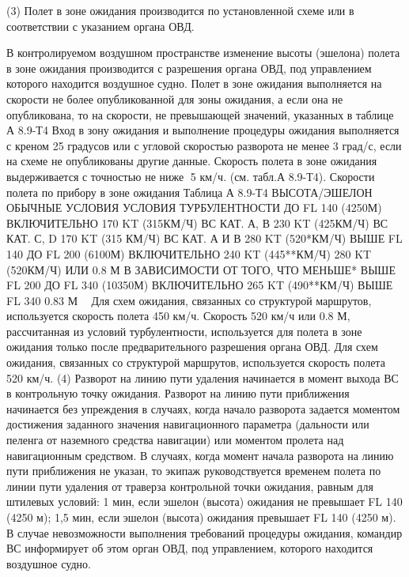        (3) Полет в зоне ожидания производится по установленной схеме или в соответствии с указанием органа ОВД.

 
В контролируемом воздушном пространстве изменение высоты (эшелона) полета в зоне ожидания производится с разрешения органа ОВД, под управлением которого находится воздушное судно. 
Полет в зоне ожидания выполняется на скорости не более опубликованной для зоны ожидания, а если она не опубликована, то на скорости, не превышающей значений, указанных в таблице А 8.9-Т4
Вход в зону ожидания и выполнение процедуры ожидания выполняется с креном 25 градусов или с угловой скоростью разворота не менее 3 град/с, если на схеме не опубликованы другие данные.
Скорость полета в зоне ожидания выдерживается с точностью не ниже 5 км/ч. (см. табл.А 8.9-Т4).
Скорости полета по прибору в зоне ожидания
                                                                                                                                          Таблица А 8.9-Т4
ВЫСОТА/ЭШЕЛОН	ОБЫЧНЫЕ УСЛОВИЯ	УСЛОВИЯ ТУРБУЛЕНТНОСТИ
ДО FL 140 (4250М) 
ВКЛЮЧИТЕЛЬНО	170 KT (315КМ/Ч) ВС КАТ. А, В
230 KT (425КМ/Ч) ВС КАТ. С, D	170 KT (315 КМ/Ч) ВС КАТ. А И В
280 KT (520*КМ/Ч)
ВЫШЕ FL 140 ДО FL 200 (6100М) ВКЛЮЧИТЕЛЬНО	240 KT (445**КМ/Ч)	
280 KT (520КМ/Ч) ИЛИ 0.8 М
В ЗАВИСИМОСТИ ОТ ТОГО, ЧТО МЕНЬШЕ*
ВЫШЕ FL 200 ДО FL 340 (10350М) ВКЛЮЧИТЕЛЬНО	265 KT (490**КМ/Ч)	
ВЫШЕ FL 340	0.83 М
 Для схем ожидания, связанных со структурой маршрутов, используется скорость полета 450 км/ч.
Скорость 520 км/ч или 0.8 М, рассчитанная из условий турбулентности, используется для полета в зоне ожидания только после предварительного разрешения органа ОВД.
Для схем ожидания, связанных со структурой маршрутов, используется скорость полета 520 км/ч.
(4) Разворот на линию пути удаления начинается в момент выхода ВС в контрольную точку ожидания. 
Разворот на линию пути приближения начинается без упреждения в случаях, когда начало разворота задается моментом достижения заданного значения навигационного параметра (дальности или пеленга от наземного средства навигации) или моментом пролета над навигационным средством. 
В случаях, когда момент начала разворота на линию пути приближения не указан, то экипаж руководствуется временем полета по линии пути удаления от траверза контрольной точки ожидания, равным для штилевых условий:
1 мин, если эшелон (высота) ожидания не превышает FL 140 (4250 м);
1,5 мин, если эшелон (высота) ожидания превышает FL 140 (4250 м).
В случае невозможности выполнения требований процедуры ожидания, командир ВС информирует об этом орган ОВД, под управлением, которого находится воздушное судно.
